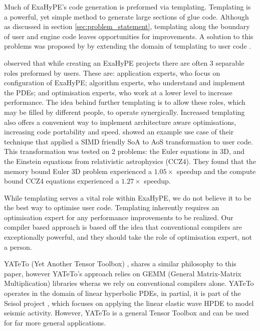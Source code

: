 


Much of ExaHyPE's code generation is preformed via templating.
Templating is a powerful, yet simple method to generate large sections of glue code.
Although as discussed in section \ref{sec:problem_statement}, templating along the boundary of user and engine code leaves opportunities for improvements.  
A solution to this problems was proposed by \citeauthor{templateExahype} by extending the domain of templating to user code \cite{templateExahype}.

\citeauthor{templateExahype} observed that while creating an ExaHyPE projects there are often 3 separable roles preformed by users.
These are: application experts, who focus on configuration of ExaHyPE; algorithm experts, who understand and implement the PDEs; and optimisation experts, who work at a lower level to increase performance.
The idea behind further templating is to allow these roles, which may be filled by different people, to operate synergically.
Increased templating also offers a convenient way to implement architecture aware optimisations, increasing code portability and speed.
\citeauthor{templateExahype} showed an example use case of their technique that applied a SIMD friendly SoA to AoS transformation to user code.
This transformation was tested on 2 problems: the Euler equations in 3D, and the Einstein equations from relativistic astrophysics (CCZ4).
They found that the memory bound Euler 3D problem experienced a $1.05\times$ speedup and the compute bound CCZ4 equations experienced a $1.27\times$ speedup.

While templating serves a vital role within ExaHyPE, we do not believe it to be the best way to optimise user code.
Templating inherently requires an optimisation expert for any performance improvements to be realized.
Our compiler based approach is based off the idea that conventional compilers are exceptionally powerful, and they should take the role of optimisation expert, not a person. 



YATeTo (Yet Another Tensor Toolbox) \cite{YATeTo}, shares a similar philosophy to this paper, however YATeTo's approach relies on GEMM (General Matrix-Matrix Multiplication) libraries wheras we rely on conventional compilers alone.
YATeTo operates in the domain of linear hyperbolic PDEs, in partial, it is part of the Seisol project \cite{seisolPFLOP}, which focuses on applying the linear elastic wave HPDE to model seismic activity.
However, YATeTo is a general Tensor Toolbox and can be used for far more general applications.

